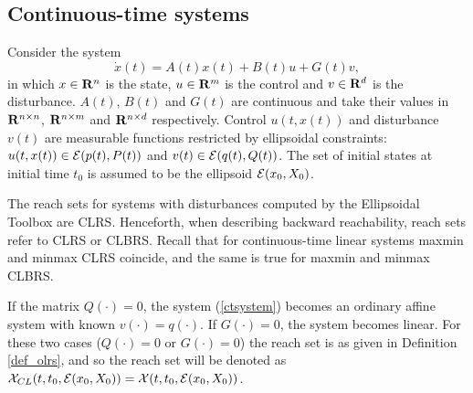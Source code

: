 \subsection{Continuous-time systems}\label{subsec_ellappct}
Consider the system
\begin{equation}
\dot{x}(t) = A(t)x(t) + B(t)u + G(t)v, \label{ctsystem}
\end{equation}
in which $x\in{\bf R}^n$ is the state, $u\in{\bf R}^m$ is the control and
$v\in{\bf R}^d$ is the disturbance. $A(t)$, $B(t)$ and $G(t)$
are continuous and take their values in ${\bf R}^{n\times n}$,
${\bf R}^{n\times m}$ and ${\bf R}^{n\times d}$ respectively.
Control $u(t,x(t))$ and disturbance $v(t)$ are measurable functions
restricted by ellipsoidal constraints:
$u(t,x(t)) \in \EE(p(t), P(t))$ and $v(t) \in \EE(q(t), Q(t))$.
The set of initial states at initial time $t_0$ is assumed
to be the ellipsoid $\EE(x_0,X_0)$.

The reach sets for systems with disturbances computed by the Ellipsoidal
Toolbox are CLRS.
Henceforth, when describing backward reachability,
reach sets  refer to CLRS or CLBRS.
Recall that for continuous-time linear systems maxmin and minmax CLRS
coincide, and the same is true for maxmin and minmax CLBRS.

If the matrix $Q(\cdot)=0$, the system (\ref{ctsystem})
becomes an ordinary affine system with known $v(\cdot)=q(\cdot)$.
If $G(\cdot) = 0$, the system becomes linear.
For these two cases ($Q(\cdot)=0$ or $G(\cdot)=0$) the reach set is
as given in Definition \ref{def_olrs}, and so
the reach set will be denoted as
$\XX_{CL}(t, t_0, \EE(x_0, X_0)) = \XX(t, t_0, \EE(x_0,X_0))$.

